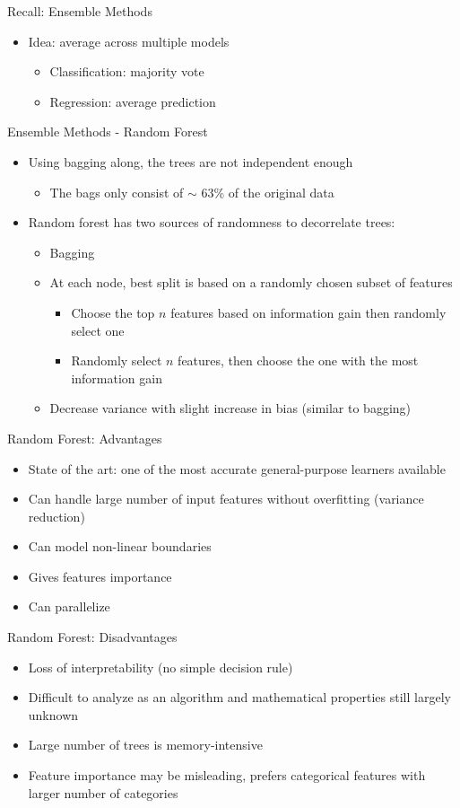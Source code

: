 \documentclass[10pt, oneside]{article}
\begin{document}
Recall: Ensemble Methods
\begin{itemize}
    \item Idea: average across multiple models
    \begin{itemize}
        \item Classification: majority vote
        \item Regression: average prediction
    \end{itemize}
\end{itemize}
Ensemble Methods - Random Forest
\begin{itemize}
    \item Using bagging along, the trees are not independent enough
    \begin{itemize}
        \item The bags only consist of $\sim$ 63\% of the original data
    \end{itemize}
    \item Random forest has two sources of randomness to decorrelate trees:
    \begin{itemize}
        \item Bagging
        \item At each node, best split is based on a randomly chosen subset of features
        \begin{itemize}
            \item Choose the top $n$ features based on information gain then randomly select one
            \item Randomly select $n$ features, then choose the one with the most information gain
        \end{itemize}
        \item Decrease variance with slight increase in bias (similar to bagging)
    \end{itemize}
\end{itemize}
Random Forest: Advantages
\begin{itemize}
    \item State of the art: one of the most accurate general-purpose learners available
    \item Can handle large number of input features without overfitting (variance reduction)
    \item Can model non-linear boundaries
    \item Gives features importance
    \item Can parallelize
\end{itemize}
Random Forest: Disadvantages
\begin{itemize}
    \item Loss of interpretability (no simple decision rule)
    \item Difficult to analyze as an algorithm and mathematical properties still largely unknown
    \item Large number of trees is memory-intensive
    \item Feature importance may be misleading, prefers categorical features with larger number of categories
\end{itemize}
\end{document}

